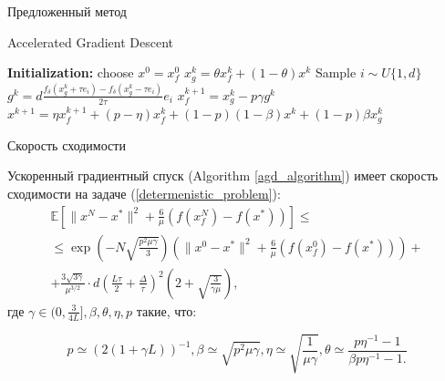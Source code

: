\documentclass{beamer}
\begin{document}


\begin{frame}{Предложенный метод}

\begin{algorithm}[H]
\caption{ Accelerated Gradient Descent }
\label{agd_algorithm}
\begin{algorithmic}
\State\textbf{Initialization:} choose $x^0 = x_f^0$
		\State $x_g^k = \theta x_f^k + (1 - \theta)x^k$
        \State Sample $i \sim U\{1, d\}$
		\State $g^k = d \frac{f_\delta(x_g^k + \tau e_i) - f_\delta(x_g^k - \tau e_i)}{2\tau}e_i$
		\State $x_f^{k + 1} = x_g^k - p \gamma g^k$
		\State $x^{k + 1} = \eta x_f^{k + 1} + (p - \eta) x_f^k + (1 - p)(1 - \beta) x^k + (1 - p)\beta x_g^k$
   \EndFor
\end{algorithmic}
\end{algorithm}

\end{frame}


\begin{frame}{Скорость сходимости}
\begin{theorem}\label{theorem1}
  Ускоренный градиентный спуск (Algorithm \ref{agd_algorithm}) имеет скорость сходимости на задаче (\ref{determenistic_problem}):
  \begin{equation}
   \begin{aligned}
   \mathbb{E}\left[\|x^N - x^*\|^2 + \frac{6}{\mu} (f(x_f^N) - f(x^*))\right] \leqslant \qquad \qquad \\
   \leqslant \exp\left(- N\sqrt{\frac{p^2\mu\gamma}{3}}\right) \left(\|x^0 - x^*\|^2 + \frac{6}{\mu} (f(x_f^0) - f(x^*))\right) +\\ +\frac{3 \sqrt{3\gamma}}{\mu^{3/2}} \cdot d \left(\frac{L\tau}{2} + \frac{\Delta}{\tau}\right)^2\left(2 + \sqrt{\frac{3}{\gamma\mu}}\right),
   \label{deterministic_convergence}
   \end{aligned}
  \end{equation}
  где $\gamma \in (0, \frac{3}{4L}], \beta, \theta, \eta, p$ такие, что:

  \begin{equation}
   p \simeq (2(1 + \gamma L))^{-1}, \beta \simeq \sqrt{p^2 \mu \gamma}, \eta \simeq \sqrt{\frac{1}{\mu\gamma}}, \theta \simeq \frac{p \eta^{-1} - 1}{\beta p \eta^{-1} - 1.}
  \end{equation}

\end{theorem}
\end{frame}
\end{document}
